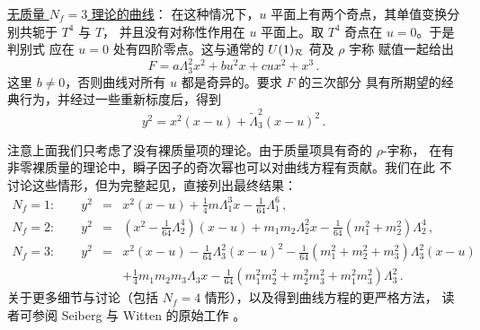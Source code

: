 \noindent\underline{无质量 $N_f=3$ 理论的曲线}：
在这种情况下，$u$ 平面上有两个奇点，其单值变换分别共轭于 $T^4$ 与 $T$，
并且没有对称性作用在 $u$ 平面上。取 $T^4$ 奇点在 $u = 0$。于是判别式
应在 $u=0$ 处有四阶零点。这与通常的 $U(1)_{\cal R}$ 荷及 $\rho$ 宇称
赋值一起给出
$$
F = a \Lambda^{2}_{3} x^2 + bu^2 x + cu x^2 + x^3 \,.
$$
这里 $b \not= 0$，否则曲线对所有 $u$ 都是奇异的。要求 $F$ 的三次部分
具有所期望的经典行为，并经过一些重新标度后，得到
$$
y^2 = x^2 (x-u) + \tilde {\Lambda}^{2}_{3} (x-u)^2\,.
$$


注意上面我们只考虑了没有裸质量项的理论。由于质量项具有奇的 $\rho$-宇称，
在有非零裸质量的理论中，瞬子因子的奇次幂也可以对曲线方程有贡献。我们在此
不讨论这些情形，但为完整起见，直接列出最终结果：
\begin{eqnarray}
N_f=1:\qquad y^2 &=& x^2(x-u)+ \frac{1}{4}m\Lambda_1^3 x -
\frac{1}{64} \Lambda_1^6\,, \nonumber \\
N_f=2:\qquad y^2 &=& (x^2-\frac{1}{64}\Lambda_2^4) (x-u) + m_1 m_2
\Lambda_2^2 x - \frac{1}{64}(m_1^2+m_2^2)\Lambda_2^4\,,\nonumber \\
N_f=3:\qquad y^2 &=& x^2(x-u)-\frac{1}{64} \Lambda_3^2(x-u)^2
-\frac{1}{64}(m_1^2+m_2^2+m_3^2) \Lambda_3^2(x-u) \nonumber \\
      && +\frac{1}{4}m_1m_2m_3 \Lambda_3 x - \frac{1}{64}
(m_1^2 m_2^2 + m_2^2 m_3^2 + m_1^2 m_3^2)\Lambda_3^2\,. \nonumber
\end{eqnarray}
关于更多细节与讨论（包括 $N_f=4$ 情形），以及得到曲线方程的更严格方法，
读者可参阅 Seiberg 与 Witten 的原始工作 \cite{SW2}。



